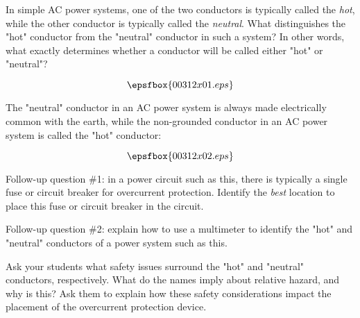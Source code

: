 

In simple AC power systems, one of the two conductors is typically called the {\it hot}, while the other conductor is typically called the {\it neutral}.  What distinguishes the "hot" conductor from the "neutral" conductor in such a system?  In other words, what exactly determines whether a conductor will be called either "hot" or "neutral"?

$$\epsfbox{00312x01.eps}$$







The "neutral" conductor in an AC power system is always made electrically common with the earth, while the non-grounded conductor in an AC power system is called the "hot" conductor:

$$\epsfbox{00312x02.eps}$$

\vskip 10pt

Follow-up question \#1: in a power circuit such as this, there is typically a single fuse or circuit breaker for overcurrent protection.  Identify the {\it best} location to place this fuse or circuit breaker in the circuit.

\vskip 10pt

Follow-up question \#2: explain how to use a multimeter to identify the "hot" and "neutral" conductors of a power system such as this.







Ask your students what safety issues surround the "hot" and "neutral" conductors, respectively.  What do the names imply about relative hazard, and why is this?  Ask them to explain how these safety considerations impact the placement of the overcurrent protection device.




